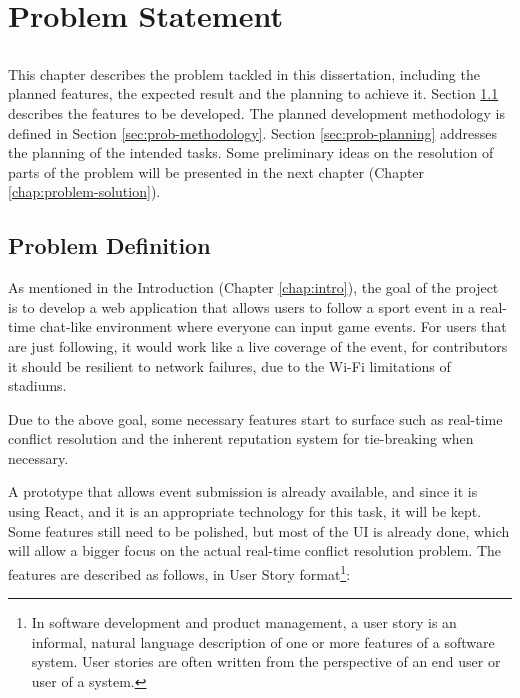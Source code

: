 \chapter{Problem Statement}\label{chap:problem}

\section*{}

This chapter describes the problem tackled in this dissertation, including the planned features, the expected result and the planning to achieve it. Section \ref{sec:prob-def} describes the features to be developed. The planned development methodology is defined in Section \ref{sec:prob-methodology}. Section \ref{sec:prob-planning} addresses the planning of the intended tasks. Some preliminary ideas on the resolution of parts of the problem will be presented in the next chapter (Chapter \ref{chap:problem-solution}).

\section{Problem Definition}\label{sec:prob-def}

As mentioned in the Introduction (Chapter \ref{chap:intro}), the goal of the project is to develop a web application that allows users to follow a sport event in a real-time chat-like environment where everyone can input game events. For users that are just following, it would work like a live coverage of the event, for contributors it should be resilient to network failures, due to the Wi-Fi limitations of stadiums.

Due to the above goal, some necessary features start to surface such as real-time conflict resolution and the inherent reputation system for tie-breaking when necessary. 

A prototype that allows event submission is already available, and since it is using React, and it is an appropriate technology for this task, it will be kept. Some features still need to be polished, but most of the UI is already done, which will allow a bigger focus on the actual real-time conflict resolution problem. The features are described as follows, in User Story format\footnote{In software development and product management, a user story is an informal, natural language description of one or more features of a software system. User stories are often written from the perspective of an end user or user of a system.}:

